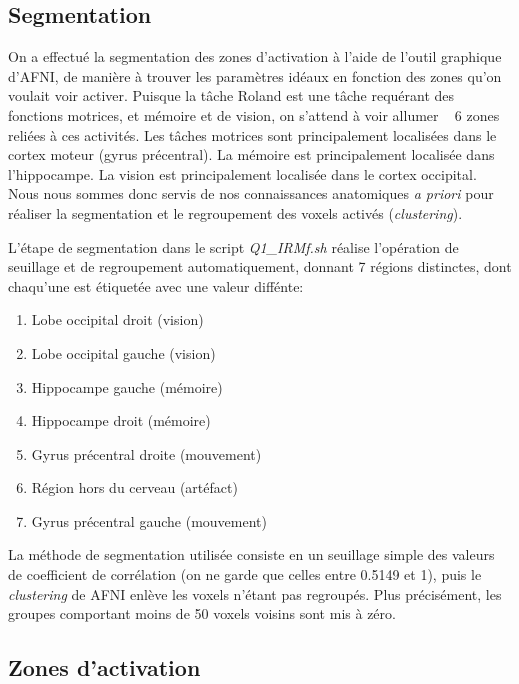 \documentclass[a4paper]{article}
\begin{document}
\subsection{Segmentation}

On a effectué la segmentation des zones d'activation à l'aide de l'outil graphique d'AFNI, de manière à trouver les paramètres idéaux en fonction des zones qu'on voulait voir activer. Puisque la tâche Roland est une tâche requérant des fonctions motrices, et mémoire et de vision, on s'attend à voir \og allumer \fg~ 6 zones reliées à ces activités. Les tâches motrices sont principalement localisées dans le cortex moteur (gyrus précentral). La mémoire est principalement localisée dans l'hippocampe. La vision est principalement localisée dans le cortex occipital. Nous nous sommes donc servis de nos connaissances anatomiques \emph{a priori} pour réaliser la segmentation et le regroupement des voxels activés (\emph{clustering}).

L'étape de segmentation dans le script \emph{Q1\_IRMf.sh} réalise l'opération de seuillage et de regroupement automatiquement, donnant 7 régions distinctes, dont chaqu'une est étiquetée avec une valeur diffénte:
	
\begin{enumerate}
    \item Lobe occipital droit (vision)
    \item Lobe occipital gauche (vision)
    \item Hippocampe gauche (mémoire)
    \item Hippocampe droit (mémoire)
    \item Gyrus précentral droite (mouvement)
    \item Région hors du cerveau (artéfact)
    \item Gyrus précentral gauche (mouvement)
\end{enumerate}

La méthode de segmentation utilisée consiste en un seuillage simple des valeurs de coefficient de corrélation (on ne garde que celles entre 0.5149 et 1), puis le \emph{clustering} de AFNI enlève les voxels n'étant pas regroupés. Plus précisément, les groupes comportant moins de 50 voxels voisins sont mis à zéro.

\subsection{Zones d'activation}
\end{document}

